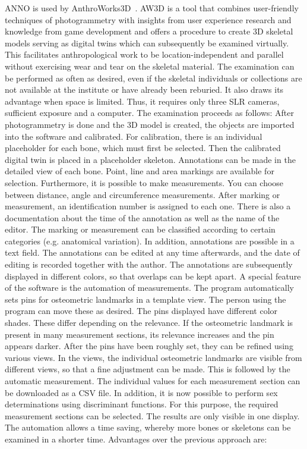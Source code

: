 \documentclass[sw]{iosart2x}
\newcommand{\aw}{AnthroWorks3D}
\begin{document}
ANNO is used by \aw{}~\citep{aw3d}.
AW3D is a tool that  combines user-friendly techniques of photogrammetry with insights from user experience research and knowledge from game development and offers a procedure to create 3D skeletal models serving as  digital twins  which can subsequently be examined virtually.
This facilitates anthropological work to be location-independent and parallel without exercising wear and tear on the skeletal material.
The examination can be performed as often as desired, even if the skeletal individuals or collections are not available at the institute or have already been reburied.
It also draws its advantage when space is limited.
Thus, it requires only three SLR cameras, sufficient exposure and a computer.
The examination proceeds as follows: After photogrammetry is done and the 3D model is created, the objects are imported into the software and calibrated.
For calibration, there is an individual placeholder for each bone, which must first be selected.
Then the calibrated digital twin is placed in a placeholder skeleton.
Annotations can be made in the detailed view of each bone.
Point, line and area markings are available for selection.
Furthermore, it is possible to make measurements.
You can choose between distance, angle and circumference measurements.
After marking or measurement, an identification number is assigned to each one.
There is also a documentation about the time of the annotation as well as the name of the editor.
The marking or measurement can be classified according to certain categories (e.g. anatomical variation).
In addition, annotations are possible in a text field.
The annotations can be edited at any time afterwards, and the date of editing is recorded together with the author.
The annotations are subsequently displayed in different colors, so that overlaps can be kept apart.
A special feature of the software is the automation of measurements.
The program automatically sets pins for osteometric landmarks in a template view.
The person using the program can move these as desired.
The pins displayed have different color shades.
These differ depending on the relevance.
If the osteometric landmark is present in many measurement sections, its relevance increases and the pin appears darker.
After the pins have been roughly set, they can be refined using various views.
In the views, the individual osteometric landmarks are visible from different views, so that a fine adjustment can be made.
This is followed by the automatic measurement.
The individual values for each measurement section can be downloaded as a CSV file.
In addition, it is now possible to perform sex determinations using discriminant functions.
For this purpose, the required measurement sections can be selected.
The results are only visible in one display.
The automation allows a time saving, whereby more bones or skeletons can be examined in a shorter time.
Advantages over the previous approach are:
\end{document}
